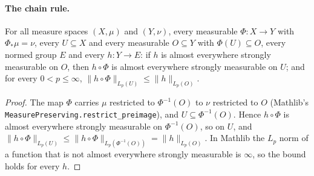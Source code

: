 \paragraph{The chain rule.}

\begin{lemma}
\label{lem:composition-measure-preserving}
\leanok
For all measure spaces $(X, \mu)$ and $(Y, \nu)$, every measurable $\Phi \colon X \to Y$ with
$\Phi_* \mu = \nu$, every $U \subseteq X$ and every measurable $O \subseteq Y$ with
$\Phi(U) \subseteq O$, every normed group $E$ and every $h \colon Y \to E$: if $h$ is almost
everywhere strongly measurable on $O$, then $h \circ \Phi$ is almost everywhere strongly
measurable on $U$; and for every $0 < p \leq \infty$,
$\|h \circ \Phi\|_{L_p(U)} \leq \|h\|_{L_p(O)}$.
\end{lemma}

\begin{proof}
\leanok
The map $\Phi$ carries $\mu$ restricted to $\Phi^{-1}(O)$ to $\nu$ restricted to $O$
(Mathlib's \texttt{MeasurePreserving.\allowbreak restrict\_\allowbreak preimage}), and
$U \subseteq \Phi^{-1}(O)$. Hence $h \circ \Phi$ is almost everywhere strongly measurable on
$\Phi^{-1}(O)$, so on $U$, and
$\|h \circ \Phi\|_{L_p(U)} \leq \|h \circ \Phi\|_{L_p(\Phi^{-1}(O))} = \|h\|_{L_p(O)}$. In
Mathlib the $L_p$ norm of a function that is not almost everywhere strongly measurable is
$\infty$, so the bound holds for every $h$.
\end{proof}

